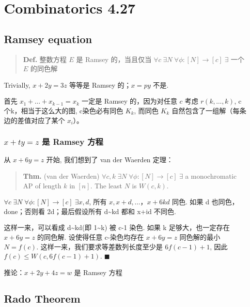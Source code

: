\chapter{Combinatorics 4.27}
\label{ch:250427}

\section{Ramsey equation}

\begin{quotation}
\textbf{Def.} 整数方程 $E$ 是 Ramsey 的，当且仅当 $\forall c\;\exists N\;\forall \phi:[N]\to[c]\;\exists$ 一个 $E$ 的同色解
\end{quotation}

Trivially, $x+2y=3z$ 等等是 Ramsey 的；$x=py$ 不是.

首先 $x_1+\dots+x_{k-1}=x_k$ 一定是 Ramsey 的，因为对任意 $c$ 考虑 $r(k,\dots,k)$, c个k，相当于这么大的图, c染色必有同色 $K_k$, 而同色 $K_k$ 自然包含了一组解（每条边的差值对应了某个 $x_i$）。

\subsection{$x+ty=z$ 是 Ramsey 方程}

从 $x+6y=z$ 开始, 我们想到了 van der Waerden 定理：

\begin{quotation}
\textbf{Thm.} (van der Waerden) $\forall c,k\;\exists N\;\forall\phi:[N]\to[c]\;\exists$ a monochromatic AP of length $k$ in $[n]$. The least $N$ is $W(c,k)$.
\end{quotation}

$\forall c\;\exists N\;\forall\phi:[N]\to[c]\;\exists x,d$, 所有 $x,x+d,\dots，x+6kd$ 同色. 如果 d 也同色，done；否则看 2d；最后假设所有 d\textasciitilde{}kd 都和 x+id 不同色.


这样一来，可以看成 d\textasciitilde{}kd(即 1\textasciitilde{}k) 被 c-1 染色. 如果 k 足够大，也一定存在 $x+6y=z$ 的同色解. 设使得任意 c-染色均存在 $x+6y=z$ 同色解的最小 $N=f(c)$. 这样一来，我们要求等差数列长度至少是 $6f(c-1)+1$, 因此 $f(c)\leq W(c,6f(c-1)+1)$. $\blacksquare$

推论：$x+2y+4z=w$ 是 Ramsey 方程


\section{Rado Theorem}

